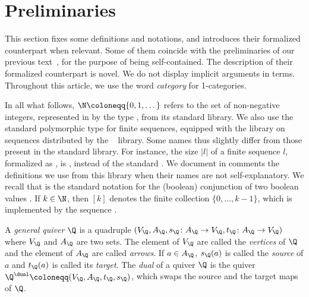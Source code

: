 \documentclass[a4paper,UKenglish,cleveref, autoref, thm-restate]{lipics-v2021}
\begin{document}
\section{Preliminaries}\label{sec:prelim}

This section fixes some definitions and notations, and introduces their formalized counterpart when relevant. Some of them coincide with the preliminaries of our previous text~\cite{DBLP:conf/csl/MahboubiP24}, for the purpose of being self-contained. The description of their formalized counterpart is novel. We do not display implicit arguments in \Coq{} terms. Throughout this article, we use the word \emph{category} for 1-categories.

In all what follows, $\N \coloneqq \{0, 1, \dots \}$ refers to the set of non-negative integers, represented in \Coq{} by the type , from its standard library. We also use the standard polymorphic type  for finite sequences, equipped with the library on sequences distributed by the \MC{}~\cite{assia_mahboubi_2021_4457887} library. Some names thus slightly differ from those present in the standard library. For instance, the size $|l|$ of a finite sequence $l$, formalized as , is , instead of the standard . We document in comments the definitions we use from this library when their names are not self-explanatory. We recall that  is the standard notation for the (boolean) conjunction of two boolean values . If $k\in\N$, then $[k]$ denotes the finite collection $\{0,\dots,k-1\}$, which is implemented by the sequence .

\begin{definition}\label{def:quiv}
  A \emph{general quiver} $\Q$ is a quadruple $(V_\Q, A_\Q, s_\Q\colon A_\Q \to V_\Q, t_\Q\colon A_\Q \to V_\Q)$ where $V_\Q$ and $A_\Q$ are two sets. The element of\/ $V_\Q$ are called the \emph{vertices} of $\Q$ and the element of $A_\Q$ are called \emph{arrows}. If $a \in A_\Q$, $s_\Q(a)$ is called the \emph{source} of $a$ and $t_\Q(a)$ is called its \emph{target}. The \emph{dual} of a quiver $\Q$ is the quiver $\Q^\dual \coloneqq (V_\Q,A_\Q,t_\Q,s_\Q)$, which swaps the source and the target maps of $\Q$.
\end{definition}
\end{document}
